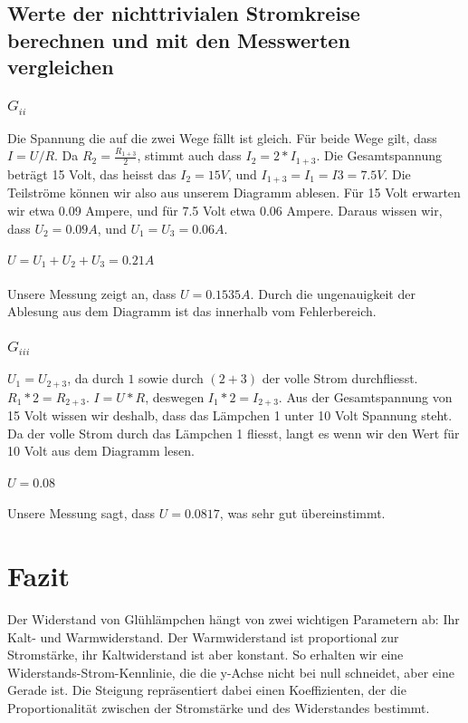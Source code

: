 \documentclass[12pt, a4paper, twoside]{article}
\begin{document}
\subsection{Werte der nichttrivialen Stromkreise berechnen und mit den Messwerten vergleichen}
\subsubsection{$G_{ii}$}
Die Spannung die auf die zwei Wege fällt ist gleich.
Für beide Wege gilt, dass $I = U/R$. Da $R_2 = \frac{R_{1+3}}{2}$,
stimmt auch dass $I_2 = 2*I_{1+3}$.
Die Gesamtspannung beträgt 15 Volt, das heisst das $I_2 = 15V$, und $I_{1 + 3} = I_{1} = I{3} = 7.5V$.
Die Teilströme können wir also aus unserem Diagramm ablesen. Für 15 Volt erwarten wir etwa 0.09 Ampere, und für 7.5 Volt etwa 0.06 Ampere.
Daraus wissen wir, dass $U_2 = 0.09A$, und $U_1 = U_3 = 0.06A$. 
\\ 
\\
$U = U_1 + U_2 + U_3 = 0.21A$
\\
\\
Unsere Messung zeigt an, dass $U = 0.1535A$. Durch die ungenauigkeit der Ablesung aus dem Diagramm ist das innerhalb vom Fehlerbereich.
\subsubsection{$G_{iii}$}
$U_1 = U_{2+3}$, da durch $1$ sowie durch $(2 + 3)$ der volle Strom durchfliesst.
$R_1*2 = R_{2+3}$. $I = U * R$, deswegen $I_1 * 2 = I_{2 + 3}$.
Aus der Gesamtspannung von 15 Volt wissen wir deshalb, dass das Lämpchen 1 unter 10 Volt Spannung steht.
Da der volle Strom durch das Lämpchen 1 fliesst, langt es wenn wir den Wert für 10 Volt aus dem Diagramm lesen.
\\
\\
$U = 0.08$
\\
\\
Unsere Messung sagt, dass $U = 0.0817$, was sehr gut übereinstimmt.

\section{Fazit}
Der Widerstand von Glühlämpchen hängt von zwei wichtigen Parametern ab:
Ihr Kalt- und Warmwiderstand. Der Warmwiderstand ist proportional zur Stromstärke, ihr Kaltwiderstand ist aber konstant.
So erhalten wir eine Widerstands-Strom-Kennlinie, die die y-Achse nicht bei null schneidet, aber eine Gerade ist.
Die Steigung repräsentiert dabei einen Koeffizienten, der die Proportionalität zwischen der Stromstärke und des Widerstandes bestimmt.
\end{document}

